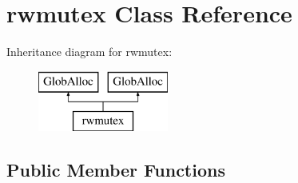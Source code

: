 \hypertarget{classrwmutex}{\section{rwmutex Class Reference}
\label{classrwmutex}
}
Inheritance diagram for rwmutex\-:\begin{figure}[H]
\begin{center}
\leavevmode
\includegraphics[height=2.000000cm]{classrwmutex}
\end{center}
\end{figure}
\subsection*{Public Member Functions}
